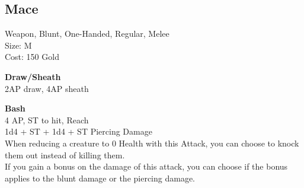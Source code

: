 \subsection{Mace}\label{weapon:mace}
Weapon, Blunt, One-Handed, Regular, Melee\\
Size: M\\
Cost: 150 Gold

\textbf{Draw/Sheath}\\
2AP draw, 4AP sheath

\textbf{Bash}\\
4 AP, ST to hit,  Reach\\
1d4 + \texttimes ST + 1d4 + \texttimes ST Piercing Damage\\
When reducing a creature to 0 Health with this Attack, you can choose to knock them out instead of killing them.\\
If you gain a bonus on the damage of this attack, you can choose if the bonus applies to the blunt damage or the piercing damage.